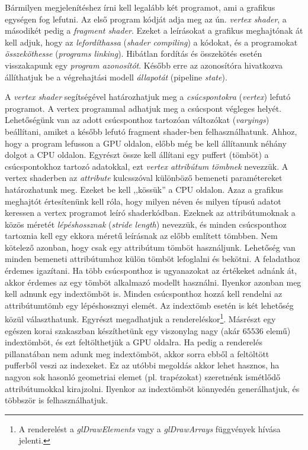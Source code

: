 \documentclass[12pt]{report}
\theoremstyle{definition}
\newcommand{\inenglish}[1]{\textsl{#1}}
\newcommand{\func}[1]{{\textsl{#1}}}
\begin{document}
Bármilyen megjelenítéshez írni kell legalább két programot, ami a grafikus
egységen fog lefutni. Az első program kódját adja meg az ún. \emph{vertex
shader}, a másodikét pedig a \emph{fragment shader}. Ezeket a leírásokat a
grafikus meghajtónak át kell adjuk, hogy az \emph{lefordíthassa}
(\inenglish{shader compiling}) a kódokat, és a programokat \emph{összeköthesse}
(\inenglish{programs linking}). Hibátlan fordítás és összekötés esetén
visszakapunk egy \emph{program azonosítót}.  Később erre az azonosítóra
hivatkozva állíthatjuk be a végrehajtási modell \emph{állapotát} (pipeline
\inenglish{state}).

A \emph{vertex shader} segítségével határozhatjuk meg a \emph{csúcspontokra}
(\inenglish{vertex}) lefutó programot. A vertex programmal adhatjuk meg a
csúcspont végleges helyét.  Lehetőségünk van az adott csúcsponthoz tartozóan
változókat (\inenglish{varyings}) beállítani, amiket a később lefutó fragment
shader-ben felhasználhatunk. Ahhoz, hogy a program lefusson a GPU oldalon,
előbb még be kell állítanunk néhány dolgot a CPU oldalon. Egyrészt össze kell
állítani egy puffert (tömböt) a csúcspontokhoz tartozó adatokkal, ezt
\emph{vertex attribútum tömbnek} nevezzük. A vertex shaderben az
\func{attribute} kulcsszóval különböző bemeneti paramétereket határozhatunk
meg. Ezeket be kell ,,kössük'' a CPU oldalon. Azaz a grafikus meghajtót
értesítenünk kell róla, hogy milyen néven és milyen típusú adatot keressen a
vertex programot leíró shaderkódban. Ezeknek az attribútumoknak a közös méretét
\emph{lépéshossznak} (\inenglish{stride length}) nevezzük, és minden
csúcsponthoz tartoznia kell egy ekkora méretű leírásnak az előbb említett
tömbben. Nem kötelező azonban, hogy csak egy attribútum tömböt használjunk.
Lehetőség van minden bemeneti attribútumhoz külön tömböt lefoglalni és bekötni.
A feladathoz érdemes igazítani. Ha több csúcsponthoz is ugyanazokat az
értékeket adnánk át, akkor érdemes az egy tömböt alkalmazó modellt használni.
Ilyenkor azonban meg kell adnunk egy indextömböt is. Minden csúcsponthoz hozzá
kell rendelni az attribútumtömb egy lépéshossznyi elemét. Az indextömb esetén
is két lehetőség közül választhatunk. Egyrészt megadhatjuk a
rendereléskor\footnote{A renderelést a \func{glDrawElements} vagy a
\func{glDrawArrays} függvények hívása jelenti.}.  Másrészt egy egészen korai
szakaszban készíthetünk egy viszonylag nagy (akár $65536$ elemű) indextömböt,
és ezt feltölthetjük a GPU oldalra. Ha pedig a renderelés pillanatában nem
adunk meg indextömböt, akkor sorra ebből a feltöltött pufferből veszi az
indexeket. Ez az utóbbi megoldás akkor lehet hasznos, ha nagyon sok hasonló
geometriai elemet (pl. trapézokat) szeretnénk ismétlődő attribútumokkal
kirajzolni. Ilyenkor az indextömböt könnyedén generálhatjuk, és többször is
felhasználhatjuk.
\end{document}
